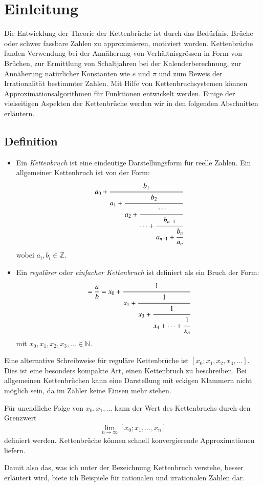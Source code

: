 %
%
%
\section{Einleitung\label{kettenbruch:section:einleitung}}
Die Entwicklung der Theorie der Kettenbrüche ist durch das Bedürfnis,
Brüche oder schwer fassbare Zahlen zu approximieren, motiviert
worden. Kettenbrüche fanden Verwendung bei der Annäherung von
Verhältnisgrössen in Form von Brüchen, zur Ermittlung von Schaltjahren
bei der Kalenderberechnung, zur Annäherung natürlicher Konstanten
wie $e$ und $\pi$ und zum Beweis der Irrationalität bestimmter
Zahlen. Mit Hilfe von Kettenbruchsystemen können Approximationsalgorithmen 
für Funktionen entwickelt werden.
Einige der vielseitigen Aspekten der Kettenbrüche
werden wir in den folgenden Abschnitten erläutern.

\subsection{Definition\label{kettenbruch:section:1s}}
\begin{itemize}
\item
Ein {\em Kettenbruch} ist eine eindeutige Darstellungsform für reelle Zahlen. 
Ein allgemeiner Kettenbruch ist von der Form:
\begin{equation}
a_0 + \cfrac{b_1}{a_1+\cfrac{b_2}{a_2+\cfrac{\cdots}{\cdots+\cfrac{b_{n-1}}{a_{n-1} + \cfrac{b_n}{a_n}}}}}
\end{equation}
wobei $a_i, b_i \in \mathbb{Z}$.
\item
Ein {\em regulärer} oder {\em einfacher Kettenbruch} ist definiert als ein
Bruch der Form:
%
%
\begin{align*}
[x_0;x_1,x_2,\cdots,x_n]
=
\frac{a}{b}=x_0+\cfrac{1}{x_1+\cfrac{1}{x_3+\cfrac{1}{x_4+\cdots+\cfrac{1}{x_n}}}}
\end{align*}
mit $x_0,x_1,x_2,x_3, \dots \in \mathbb{N}$.
\end{itemize}

Eine alternative Schreibweise für reguläre Kettenbrüche ist
$[x_0;x_1,x_2,x_3,\dots]$.
Dies ist eine besonders kompakte Art, einen Kettenbruch zu beschreiben.
Bei allgemeinen Kettenbrüchen kann eine 
Darstellung mit eckigen Klammern nicht möglich sein, da im Zähler keine Einsen
mehr stehen.


Für unendliche Folge von $x_0,x_1,\dots$ kann der Wert des Kettenbruchs
durch den Grenzwert
\begin{align*}
\lim_{n\to\infty} [x_0;x_1,\dots,x_n] 
\end{align*}  
definiert werden.
Kettenbrüche können schnell konvergierende Approximationen liefern.

Damit also das, was ich unter der Bezeichnung Kettenbruch verstehe,
besser erläutert wird, biete ich Beispiele für
rationalen und irrationalen Zahlen dar.

